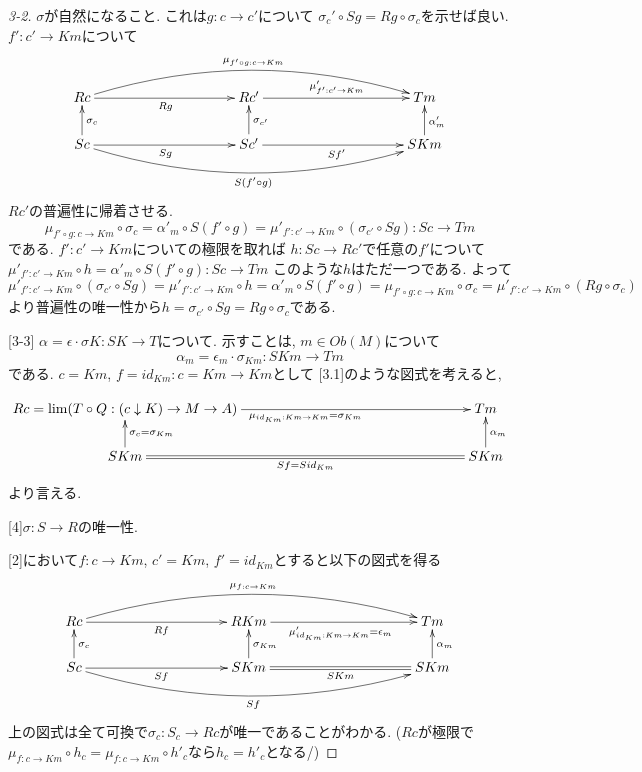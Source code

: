 \documentclass[dvipdfmx,a4paper,11pt]{article}
\theoremstyle{definition}
\begin{document}
\begin{proof}
[3-2] $\sigma$が自然になること.
これは$g : c \to c'$について
$\sigma_c' \circ Sg = Rg \circ\sigma_{c}$を示せば良い.
$f' : c' \to Km$について
\begin{equation*}
\xymatrix@C=100pt@R=20pt{
Rc  \ar@{->}[r]_{Rg}  
\ar@/^20pt/[rr]^{\mu_{f' \circ g : c \to Km}} 
& Rc'  \ar@{->}[r]^{\mu'_{f' : c' \to Km}} 
&Tm  \\
Sc\ar@{->}[r]_{Sg}  \ar@{->}[u]_{\sigma_c}
\ar@/_20pt/[rr]_{S(f' \circ g)} 
& Sc' \ar@{->}[r]_{Sf'} \ar@{->}[u]_{\sigma_{c'}}
&SKm \ar@{->}[u]_{\alpha_m'} \\   
}
\end{equation*}
$Rc'$の普遍性に帰着させる. 
$$
\mu_{f' \circ g : c \to Km}\circ \sigma_c
=
\alpha'_{m} \circ S(f' \circ g)
=
\mu'_{f' : c' \to Km} \circ ( \sigma_{c'}\circ Sg) : Sc \to Tm
$$
である. $f' : c' \to Km$についての極限を取れば
$h : Sc  \to Rc'$で任意の$f'$について
$\mu'_{f' : c' \to Km} \circ h  = \alpha'_{m} \circ S(f' \circ g) : Sc \to Tm$
このような$h$はただ一つである. 
よって
$$
\mu'_{f' : c' \to Km} \circ ( \sigma_{c'}\circ Sg) 
=
\mu'_{f' : c' \to Km} \circ h 
 = \alpha'_{m} \circ S(f' \circ g)
 =\mu_{f' \circ g : c \to Km}\circ \sigma_c
 =
\mu'_{f' : c' \to Km} \circ (Rg \circ \sigma_c)
$$
より普遍性の唯一性から$h = \sigma_{c'}\circ Sg = Rg \circ \sigma_c$である. 

[3-3]  $\alpha = \epsilon \cdot \sigma K : SK \to T$について.
示すことは, $m \in Ob(M)$について
$$
\alpha_{m} = \epsilon_{m} \cdot  \sigma_{Km}:SKm \to Tm
$$
である. 
$c = Km$, $f = id_{Km} : c=Km \to Km$として
[3.1]のような図式を考えると, 

\begin{equation*}
\xymatrix@C=160pt@R=20pt{
Rc = \lim (T \circ Q : (c \downarrow K) \to M \to A) \ar@{->}[r]_{\mu_{id_{Km}: Km \to Km} = \sigma_{Km}}  
& Tm  \\
SKm\ar@{=}[r]_{Sf = Sid_{Km}}  \ar@{->}[u]_{\sigma_c = \sigma_{Km}}
& SKm  \ar@{->}[u]_{\alpha_m}  \\   
}
\end{equation*}
より言える. 

[4]$\sigma : S \to R$の唯一性. 

[2]において$f : c \to Km$, $c' =Km$, $f' = id_{Km}$とすると以下の図式を得る
\begin{equation*}
\xymatrix@C=100pt@R=20pt{
Rc  \ar@{->}[r]_{Rf}  
\ar@/^20pt/[rr]^{\mu_{ f : c \to Km}} 
& RKm  \ar@{->}[r]_{\mu'_{id_{Km} : Km \to Km} = \epsilon_{m}} 
&Tm  \\
Sc\ar@{->}[r]_{Sf}  \ar@{->}[u]_{\sigma_c}
\ar@/_20pt/[rr]_{Sf} 
& SKm \ar@{=}[r]_{SKm} \ar@{->}[u]_{\sigma_{Km}}
&SKm \ar@{->}[u]_{\alpha_m} \\   
}
\end{equation*}
上の図式は全て可換で$\sigma_c: S_c \to Rc$が唯一であることがわかる.
($Rc$が極限で$\mu_{ f : c \to Km} \circ h_c =\mu_{ f : c \to Km}\circ  h'_c$なら$h_c = h'_c$となる/)
\end{proof}
\end{document}

